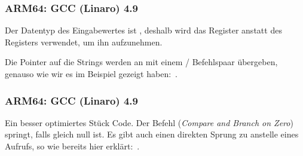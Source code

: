 \subsubsection{ARM64: \NonOptimizing GCC (Linaro) 4.9}


Der Datentyp des Eingabewertes ist \Tint, deshalb wird das Register  anstatt des  Registers verwendet,
um ihn aufzunehmen.

Die Pointer auf die Strings werden an \puts mit einem / Befehlspaar übergeben, genauso wie wir es im
\q{\HelloWorldSectionName} Beispiel gezeigt haben:~.

\subsubsection{ARM64: \Optimizing GCC (Linaro) 4.9}


Ein besser optimiertes Stück Code. 
Der Befehl  (\emph{Compare and Branch on Zero}) springt, falls  gleich null ist.
Es gibt auch einen direkten Sprung zu \puts anstelle eines Aufrufs, so wie bereits hier
erklärt:~.

